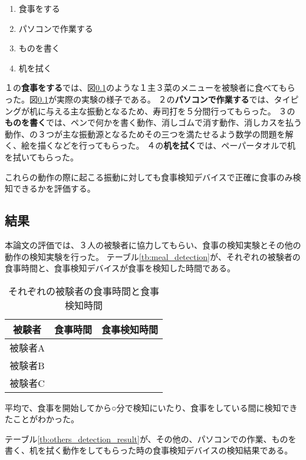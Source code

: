 \begin{enumerate}
  \item 食事をする
  \item パソコンで作業する
  \item ものを書く
  \item 机を拭く
\end{enumerate}

１の\textbf{食事をする}では、図\ref{}のような１主３菜のメニューを被験者に食べてもらった。図\ref{}が実際の実験の様子である。
２の\textbf{パソコンで作業する}では、タイピングが机に与える主な振動となるため、寿司打\cite{sushida}を５分間行ってもらった。
３の\textbf{ものを書く}では、ペンで何かを書く動作、消しゴムで消す動作、消しカスを払う動作、の３つが主な振動源となるためその三つを満たせるよう数学の問題を解く、絵を描くなどを行ってもらった。
４の\textbf{机を拭く}では、ペーパータオルで机を拭いてもらった。

これらの動作の際に起こる振動に対しても食事検知デバイスで正確に食事のみ検知できるかを評価する。

\subsection{結果}

本論文の評価では、３人の被験者に協力してもらい、食事の検知実験とその他の動作の検知実験を行った。
テーブル\ref{tb:meal_detection}が、それぞれの被験者の食事時間と、食事検知デバイスが食事を検知した時間である。

\begin{table}[htbp]
  \caption{それぞれの被験者の食事時間と食事検知時間}
  \label{tb:meal_detection_result}
  \begin{center}
    \begin{tabular}{|c||c|c|}
      \hline
      被験者  & 食事時間 & 食事検知時間 \\
      \hline\hline
      被験者A &  & \\\hline
      被験者B &  & \\\hline
      被験者C &  & \\\hline
    \end{tabular}
  \end{center}
\end{table}

平均で、食事を開始してから○分で検知にいたり、食事をしている間に検知できたことがわかった。

テーブル\ref{tb:others_detection_result}が、その他の、パソコンでの作業、ものを書く、机を拭く動作をしてもらった時の食事検知デバイスの検知結果である。

